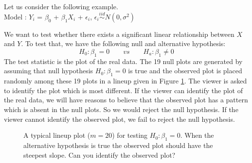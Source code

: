 \documentclass[12]{report}
\begin{document}
Let us consider the following example. \\

Model : $Y_i$ = $\beta_0$ + $\beta_1 X_i$ + $\epsilon_i$, \qquad $\epsilon_i \stackrel{iid}{\sim} N(0, \sigma^2)$ \\
\vspace{0.1cm}

We want to test whether there exists a significant linear relationship between $X$ and $Y$. To test that, we have the following null and alternative hypothesis:
\[
H_0: \beta_1 = 0 \qquad vs \qquad H_a: \beta_1 \ne 0
\]
The test statistic is the plot of the real data. The 19 null plots are generated by assuming that null hypothesis $H_0: \beta_1 = 0$ is true and the observed plot is placed randomly among these 19 plots in a lineup given in Figure \ref{lineup}. The viewer is asked to identify the plot which is most different. If the viewer can identify the plot of the real data, we will have reasons to believe that the observed plot has a pattern which is absent in the null plots. So we would reject the null hypothesis. If the viewer cannot identify the observed plot, we fail to reject the null hypothesis. \\

\begin{figure}[hbtp]
   \centering
      \caption{A typical lineup plot ($m = 20$) for testing $H_0: \beta_1 = 0$. 
      When the alternative hypothesis is true the observed plot should have the steepest slope. Can you identify the observed plot?}
      \label{lineup}
\end{figure}
\end{document}
